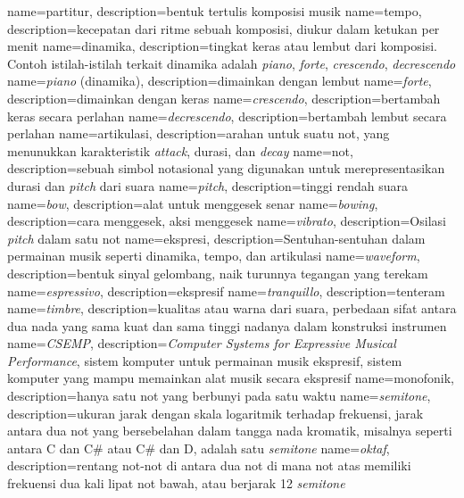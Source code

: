 {
    name=partitur,
    description={bentuk tertulis komposisi musik}
}
{
    name=tempo,
    description={kecepatan dari ritme sebuah komposisi, diukur dalam ketukan per menit}
}
{
	name=dinamika,
	description={tingkat keras atau lembut dari komposisi. Contoh istilah-istilah terkait dinamika adalah \textit{piano}, \textit{forte}, \textit{crescendo}, \textit{decrescendo}}
}
{
	name={\textit{piano} (dinamika)},
	description={dimainkan dengan lembut}
}
{
	name=\textit{forte},
	description={dimainkan dengan keras}
}
{
	name=\textit{crescendo},
	description={bertambah keras secara perlahan}
}
{
	name=\textit{decrescendo},
	description={bertambah lembut secara perlahan}
}
{
	name=artikulasi,
	description={arahan untuk suatu not, yang menunukkan karakteristik \textit{attack}, durasi, dan \textit{decay}}
}
{
	name=not,
	description={sebuah simbol notasional yang digunakan untuk merepresentasikan durasi dan \textit{pitch} dari suara}
}
{
	name=\textit{pitch},
	description={tinggi rendah suara}
}
{
	name=\textit{bow},
	description={alat untuk menggesek senar}
}
{
	name=\textit{bowing},
	description={cara menggesek, aksi menggesek}
}
{
	name=\textit{vibrato},
	description={Osilasi \textit{pitch} dalam satu not}
}
{
	name=ekspresi,
	description={Sentuhan-sentuhan dalam permainan musik seperti dinamika, tempo, dan artikulasi}
}
{
	name=\textit{waveform},
	description={bentuk sinyal gelombang, naik turunnya tegangan yang terekam}
}
{
	name=\textit{espressivo},
	description={ekspresif}
}
{
	name=\textit{tranquillo},
	description={tenteram}
}
{
	name=\textit{timbre},
	description={kualitas atau warna dari suara, perbedaan sifat antara dua nada yang sama kuat dan sama tinggi nadanya dalam konstruksi instrumen}
}
{
	name=\textit{CSEMP},
	description={\textit{Computer Systems for Expressive Musical Performance}, sistem komputer untuk permainan musik ekspresif, sistem komputer yang mampu memainkan alat musik secara ekspresif}
}
{
	name=monofonik,
	description={hanya satu not yang berbunyi pada satu waktu}
}
{
	name=\textit{semitone},
	description={ukuran jarak dengan skala logaritmik terhadap frekuensi, jarak antara dua not yang bersebelahan dalam tangga nada kromatik, misalnya seperti antara C dan C\# atau C\# dan D, adalah satu \textit{semitone}}
}
{
	name=\textit{oktaf},
	description={rentang not-not di antara dua not di mana not atas memiliki frekuensi dua kali lipat not bawah, atau berjarak 12 \textit{semitone}	}
}